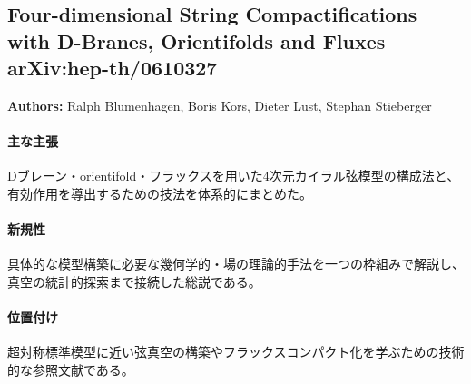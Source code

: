 \subsection{Four-dimensional String Compactifications with D-Branes, Orientifolds and Fluxes --- arXiv:hep-th/0610327}

\textbf{Authors:} Ralph Blumenhagen, Boris Kors, Dieter Lust, Stephan Stieberger

\paragraph{主な主張}
Dブレーン・orientifold・フラックスを用いた4次元カイラル弦模型の構成法と、有効作用を導出するための技法を体系的にまとめた。 \cite{Blumenhagen:2006ci}

\paragraph{新規性}
具体的な模型構築に必要な幾何学的・場の理論的手法を一つの枠組みで解説し、真空の統計的探索まで接続した総説である。

\paragraph{位置付け}
超対称標準模型に近い弦真空の構築やフラックスコンパクト化を学ぶための技術的な参照文献である。
